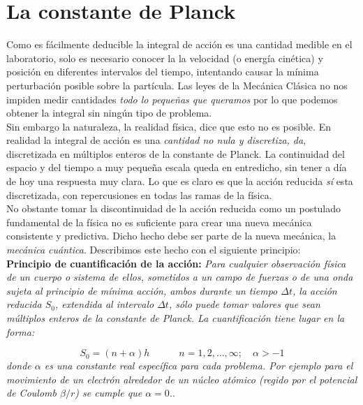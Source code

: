 \documentclass[12pt]{article}
\newcommand{\tquad}{\quad \quad \quad}
\begin{document}
\section{La constante de Planck}

Como es fácilmente deducible la integral de acción es una cantidad medible en el laboratorio, solo es necesario conocer la la velocidad (o energía cinética) y posición en diferentes intervalos del tiempo, intentando causar la mínima perturbación posible sobre la partícula. Las leyes de la Mecánica Clásica no nos impiden medir cantidades \textit{todo lo pequeñas que queramos} por lo que podemos obtener la integral sin ningún tipo de problema. \\

Sin embargo la naturaleza, la realidad física, dice que esto no es posible. En realidad la integral de acción es una \textit{cantidad no nula y discretiza, da}, discretizada en múltiplos enteros de la constante de Planck. La continuidad del espacio y del tiempo a muy pequeña escala queda en entredicho, sin tener a día de hoy una respuesta muy clara. Lo que es claro es que la acción reducida \textit{sí} esta discretizada, con repercusiones en todas las ramas de la física.  \\

No obstante tomar la discontinuidad de la acción reducida como un postulado fundamental de la física no es suficiente para crear una nueva mecánica consistente y predictiva. Dicho hecho debe ser parte de la nueva mecánica, la \textit{mecánica cuántica}. Describimos este hecho con el siguiente principio: \\


\textbf{Principio de cuantificación de la acción:} \textit{Para cualquier observación física de un cuerpo o sistema de ellos, sometidos a un campo de fuerzas o de una onda sujeta al principio de mínima acción, ambos durante un tiempo $\Delta t$, la acción reducida $S_0$, extendida al intervalo $\Delta t$, sólo puede tomar valores que sean múltiplos enteros de la constante de Planck. La cuantificación tiene lugar en la forma:}

\begin{equation}
S_0 = (n+\alpha) h \tquad n=1,2,\ldots,\infty; \quad \alpha > -1
\end{equation}
\textit{donde $\alpha$ es una constante real específica para cada problema. Por ejemplo para el movimiento de un electrón alrededor de un núcleo atómico (regido por el potencial de Coulomb $\beta/r$) se cumple que $\alpha =0$.}. \\
\end{document}
